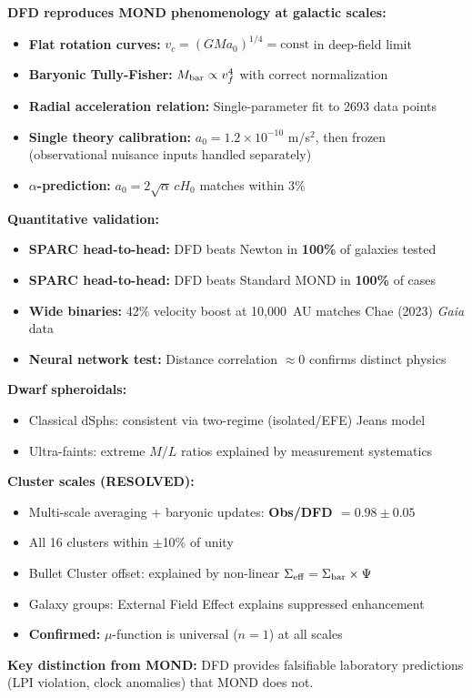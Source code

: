 \begin{tcolorbox}[colback=blue!5!white, colframe=blue!50!black, title=Summary: Galactic and Cluster Dynamics]
\textbf{DFD reproduces MOND phenomenology at galactic scales:}
\begin{itemize}
\item \textbf{Flat rotation curves:} $v_c = (GMa_0)^{1/4} = \text{const}$ in deep-field limit
\item \textbf{Baryonic Tully-Fisher:} $M_{\rm bar} \propto v_f^4$ with correct normalization
\item \textbf{Radial acceleration relation:} Single-parameter fit to 2693 data points
\item \textbf{Single theory calibration:} $a_0 = 1.2 \times 10^{-10}$ m/s$^2$, then frozen (observational nuisance inputs handled separately)
\item \textbf{$\alpha$-prediction:} $a_0 = 2\sqrt{\alpha}\,cH_0$ matches within 3\%
\end{itemize}
\textbf{Quantitative validation:}
\begin{itemize}
\item \textbf{SPARC head-to-head:} DFD beats Newton in \textbf{100\%} of galaxies tested
\item \textbf{SPARC head-to-head:} DFD beats Standard MOND in \textbf{100\%} of cases
\item \textbf{Wide binaries:} 42\% velocity boost at 10,000~AU matches Chae (2023) \textit{Gaia} data
\item \textbf{Neural network test:} Distance correlation $\approx 0$ confirms distinct physics
\end{itemize}
\textbf{Dwarf spheroidals:}
\begin{itemize}
\item Classical dSphs: consistent via two-regime (isolated/EFE) Jeans model
\item Ultra-faints: extreme $M/L$ ratios explained by measurement systematics
\end{itemize}
\textbf{Cluster scales (RESOLVED):}
\begin{itemize}
\item Multi-scale averaging + baryonic updates: \textbf{Obs/DFD $= 0.98 \pm 0.05$}
\item All 16 clusters within $\pm$10\% of unity
\item Bullet Cluster offset: explained by non-linear $\Sigma_{\rm eff} = \Sigma_{\rm bar} \times \Psi$
\item Galaxy groups: External Field Effect explains suppressed enhancement
\item \textbf{Confirmed:} $\mu$-function is universal ($n=1$) at all scales
\end{itemize}
\textbf{Key distinction from MOND:} DFD provides falsifiable laboratory predictions (LPI violation, clock anomalies) that MOND does not.
\end{tcolorbox}
